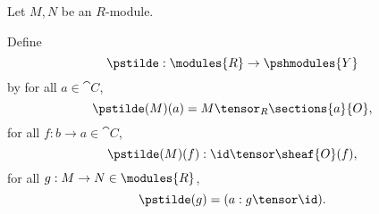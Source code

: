 \begin{definition}
Let $M,N$ be an $R$-module.

Define 
\[\pstilde: \modules{R} \rightarrow \pshmodules{Y}\]
by
for all $a \in \cat{C}$, 
\[\pstilde(M)(a) = M \tensor_R \sections{a}{O} ,\]
for all $f:b \rightarrow a \in \cat{C}$, 
\[\pstilde(M)(f): \id \tensor \sheaf{O}(f) ,\]
for all $g:M \rightarrow N \in \modules{R}$,
\[\pstilde(g) = (a: g \tensor \id ).\]
\end{definition}